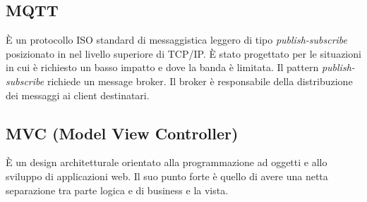 \subsection*{MQTT} È un protocollo ISO standard di messaggistica leggero di tipo \textit{publish-subscribe} posizionato in nel livello superiore di TCP/IP. È stato progettato per le situazioni in cui è richiesto un basso impatto e dove la banda è limitata. Il pattern \textit{publish-subscribe} richiede un message broker. Il broker è responsabile della distribuzione dei messaggi ai client destinatari.

\subsection*{MVC (Model View Controller)} È un design architetturale orientato alla programmazione ad oggetti  e allo sviluppo di applicazioni web. Il suo punto forte è quello di avere una netta separazione tra parte logica e di business e la vista.
